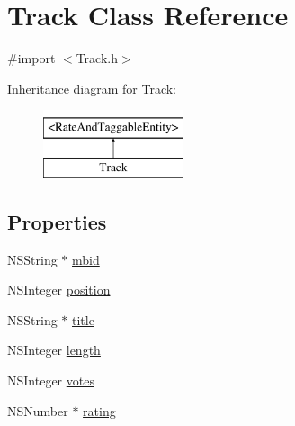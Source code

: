 \hypertarget{interface_track}{\section{Track Class Reference}
\label{interface_track}
}


{\ttfamily \#import $<$Track.\-h$>$}

Inheritance diagram for Track\-:\begin{figure}[H]
\begin{center}
\leavevmode
\includegraphics[height=2.000000cm]{interface_track}
\end{center}
\end{figure}
\subsection*{Properties}
\begin{DoxyCompactItemize}
\item 
N\-S\-String $\ast$ \hyperlink{interface_track_abf369569acae3080e08c1899a4b3c2fb}{mbid}
\item 
N\-S\-Integer \hyperlink{interface_track_ad810ddd47df45e57de7fdddd6af39630}{position}
\item 
N\-S\-String $\ast$ \hyperlink{interface_track_a407472349ab50c158d152375b308fa0f}{title}
\item 
N\-S\-Integer \hyperlink{interface_track_aed1956f60b12f73b4d48bf387843857d}{length}
\item 
N\-S\-Integer \hyperlink{interface_track_af501aaab88ac8b70f30fc149dee01502}{votes}
\item 
N\-S\-Number $\ast$ \hyperlink{interface_track_aaa30de7e6b8ff801014465ded04e866e}{rating}
\end{DoxyCompactItemize}


